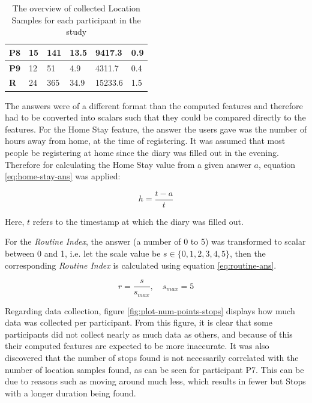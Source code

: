 \begin{table}[]
\begin{tabular}{|l|l|l|l|l|l|}
        \textbf{P8}                & 15                   & 141                        & 13.5                           & 9417.3                              & 0.9                              \\ \hline
        \textbf{P9}                & 12                   & 51                         & 4.9                            & 4311.7                              & 0.4                              \\ \hline
        \textbf{R}                 & 24                   & 365                        & 34.9                           & 15233.6                             & 1.5                                    \\ \hline
        \end{tabular}

    \caption{The overview of collected Location Samples for each participant in the study}
    \label{tab:location-samples}
\end{table}

The answers were of a different format than the computed features and therefore had to be converted into scalars such that they could be compared directly to the features. For the Home Stay feature, the answer the users gave was the number of hours away from home, at the time of registering. It was assumed that most people be registering at home since the diary was filled out in the evening. Therefore for calculating the Home Stay value from a given answer $a$, equation \ref{eq:home-stay-ans} was applied:

\begin{equation}
\label{eq:home-stay-ans}
    h = \frac{t - a }{t}
\end{equation}

Here, $t$ refers to the timestamp at which the diary was filled out.

For the \textit{Routine Index}, the answer (a number of 0 to 5) was transformed to scalar between 0 and 1, i.e. let the scale value be $s \in \{0, 1, 2, 3, 4, 5\}$, then the corresponding \textit{Routine Index} is calculated using equation \ref{eq:routine-ans}.

\begin{equation}
\label{eq:routine-ans}
    r = \frac{s}{s_{max}}, \quad s_{max} = 5
\end{equation}

Regarding data collection, figure \ref{fig:plot-num-points-stops} displays how much data was collected per participant. From this figure, it is clear that some participants did not collect nearly as much data as others, and because of this their computed features are expected to be more inaccurate. It was also discovered that the number of stops found is not necessarily correlated with the number of location samples found, as can be seen for participant P7. This can be due to reasons such as moving around much less, which results in fewer but Stops with a longer duration being found. 

